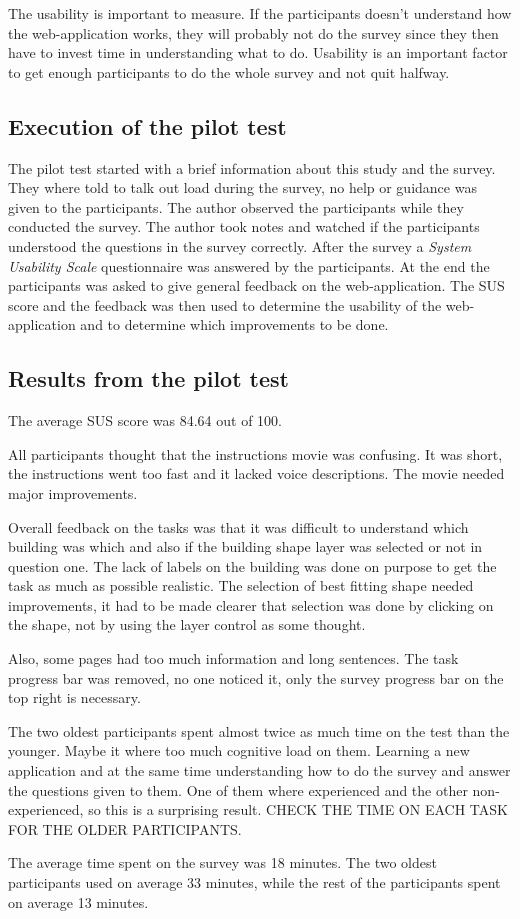 The usability is important to measure. If the participants doesn't understand how the web-application works, they will probably not do the survey since they then have to invest time in understanding what to do. %
Usability is an important factor to get enough participants to do the whole survey and not quit halfway. 

\subsection{Execution of the pilot test}
The pilot test started with a brief information about this study and the survey. They where told to talk out load during the survey, no help or guidance was given to the participants. The author observed the participants while they conducted the survey. The author took notes and watched if the participants understood the questions in the survey correctly. After the survey a \textit{System Usability Scale} questionnaire was answered by the participants. At the end the participants was asked to give general feedback on the web-application. The SUS score and the feedback was then used to determine the usability of the web-application and to determine which improvements to be done.  

\subsection{Results from the pilot test}
The average SUS score was 84.64 out of 100. 

All participants thought that the instructions movie was confusing. It was short, the instructions went too fast and it lacked voice descriptions. The movie needed major improvements. 

Overall feedback on the tasks was that it was difficult to understand which building was which and also if the building shape layer was selected or not in question one. The lack of labels on the building was done on purpose to get the task as much as possible realistic. The selection of best fitting shape needed improvements, it had to be made clearer that selection was done by clicking on the shape, not by using the layer control as some thought. 
 
Also, some pages had too much information and long sentences. The task progress bar was removed, no one noticed it, only the survey progress bar on the top right is necessary. 

The two oldest participants spent almost twice as much time on the test than the younger. Maybe it where too much cognitive load on them. Learning a new application and at the same time understanding how to do the survey and answer the questions given to them. One of them where experienced and the other non-experienced, so this is a surprising result.  CHECK THE TIME ON EACH TASK FOR THE OLDER PARTICIPANTS. 

The average time spent on the survey was 18 minutes. The two oldest participants used on average 33 minutes, while the rest of the participants spent on average 13 minutes. 




